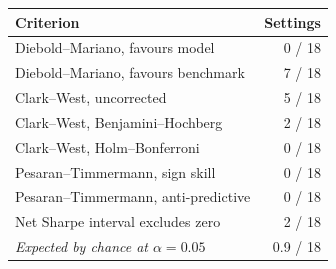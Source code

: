 \begin{tabular}{lr}
\toprule
Criterion & Settings \\
\midrule
Diebold--Mariano, favours model & 0 / 18 \\
Diebold--Mariano, favours benchmark & 7 / 18 \\
Clark--West, uncorrected & 5 / 18 \\
Clark--West, Benjamini--Hochberg & 2 / 18 \\
Clark--West, Holm--Bonferroni & 0 / 18 \\
Pesaran--Timmermann, sign skill & 0 / 18 \\
Pesaran--Timmermann, anti-predictive & 0 / 18 \\
Net Sharpe interval excludes zero & 2 / 18 \\
\addlinespace
\emph{Expected by chance at $\alpha=0.05$} & 0.9 / 18 \\
\bottomrule
\end{tabular}
